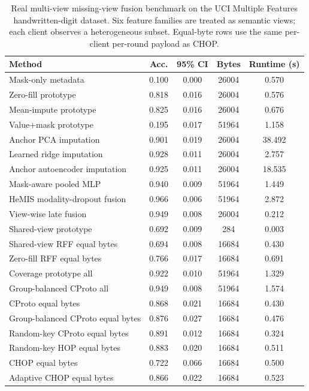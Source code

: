 \begin{table}[t]
\centering
\caption{Real multi-view missing-view fusion benchmark on the UCI Multiple Features handwritten-digit dataset. Six feature families are treated as semantic views; each client observes a heterogeneous subset. Equal-byte rows use the same per-client per-round payload as CHOP.}
\label{tab:if-mfeat-fusion}
\scriptsize
\setlength{\tabcolsep}{3pt}
\renewcommand{\arraystretch}{0.94}
\begin{tabular}{lcccc}
\toprule
Method & Acc. & 95\% CI & Bytes & Runtime (s) \\
\midrule
Mask-only metadata & 0.100 & 0.000 & 26004 & 0.570 \\
Zero-fill prototype & 0.818 & 0.016 & 26004 & 0.576 \\
Mean-impute prototype & 0.825 & 0.016 & 26004 & 0.676 \\
Value+mask prototype & 0.195 & 0.017 & 51964 & 1.158 \\
Anchor PCA imputation & 0.901 & 0.019 & 26004 & 38.492 \\
Learned ridge imputation & 0.928 & 0.011 & 26004 & 2.757 \\
Anchor autoencoder imputation & 0.925 & 0.011 & 26004 & 18.535 \\
Mask-aware pooled MLP & 0.940 & 0.009 & 51964 & 1.449 \\
HeMIS modality-dropout fusion & 0.966 & 0.006 & 51964 & 2.872 \\
View-wise late fusion & 0.949 & 0.008 & 26004 & 0.212 \\
Shared-view prototype & 0.692 & 0.009 & 284 & 0.003 \\
Shared-view RFF equal bytes & 0.694 & 0.008 & 16684 & 0.430 \\
Zero-fill RFF equal bytes & 0.766 & 0.017 & 16684 & 0.691 \\
Coverage prototype all & 0.922 & 0.010 & 51964 & 1.329 \\
Group-balanced CProto all & 0.949 & 0.008 & 51964 & 1.574 \\
CProto equal bytes & 0.868 & 0.021 & 16684 & 0.430 \\
Group-balanced CProto equal bytes & 0.876 & 0.027 & 16684 & 0.476 \\
Random-key CProto equal bytes & 0.891 & 0.012 & 16684 & 0.324 \\
Random-key HOP equal bytes & 0.883 & 0.020 & 16684 & 0.511 \\
CHOP equal bytes & 0.722 & 0.066 & 16684 & 0.500 \\
Adaptive CHOP equal bytes & 0.866 & 0.022 & 16684 & 0.523 \\
\bottomrule
\end{tabular}
\end{table}
